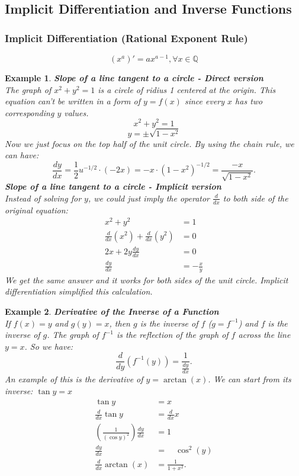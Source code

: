 \documentclass[10pt, a4paper]{article}
\newtheorem{example}{Example}
\begin{document}
\subsection{Implicit Differentiation and Inverse Functions}
\subsubsection*{Implicit Differentiation (Rational Exponent Rule)}
\[
    (x^a)' = ax^{a-1}, \forall x \in \mathbb{Q} 
\]

\begin{example}
    \textbf{Slope of a line tangent to a circle - Direct version} \\
    The graph of $x^2 + y^2 = 1$ is a circle of ridius 1 centered at the origin. 
    This equation can't be written in a form of $y = f(x)$ since every $x$ has two corresponding $y$ values.
    \[
        x^2 + y^2 = 1
    \]
    \[
        y = \pm \sqrt{1 - x^2}
    \]
    Now we just focus on the top half of the unit circle. By using the chain rule, we can have: 
    \[
        \frac{dy}{dx}=\frac12u^{-1/2}\cdot(-2x)=-x\cdot(1-x^2)^{-1/2}=\frac{-x}{\sqrt{1-x^2}}.
    \]
    \textbf{Slope of a line tangent to a circle - Implicit version} \\
    Instead of solving for $y$, we could just imply the operator $\frac{d}{dx}$ to both side of the original equation:
    \begin{align*}
        x^2 + y^2 &= 1 \\
        \frac{d}{dx} (x^2) + \frac{d}{dx} (y^2) &= 0 \\
        2x + 2y\frac{dy}{dx} &= 0 \\
        \frac{dy}{dx} &= -\frac{x}{y}
    \end{align*}
    We get the same answer and it works for both sides of the unit circle.
    Implicit differentiation simplified this calculation.
\end{example}
\begin{example}
    \textbf{Derivative of the Inverse of a Function}\\
    If $f(x) = y$ and $g(y) = x$, then $g$ is the inverse of $f$ ($g = f^{-1}$) and $f$ is the inverse of $g$.
    The graph of $f ^{-1}$ is the reflection of the graph of $f$ across the line $y = x$. So we have:
    \[
        \frac d{dy}(f^{-1}(y))=\frac1{\frac{dy}{dx}}.
    \]
    An example of this is the derivative of $y = \arctan(x)$. We can start from its inverse: $\tan y = x$
    \begin{align*}
        \tan y &= x \\
        \frac{d}{dx}\tan y &= \frac{d}{dx}x \\
        \left(\frac{1}{(\cos y)^2}\right)\frac{dy}{dx} &= 1 \\
        \frac{dy}{dx}\quad &= \quad\cos^2(y)\\
        \frac d{dx}\arctan(x)&=\frac1{1+x^2}. 
    \end{align*} 
\end{example}
\end{document}
